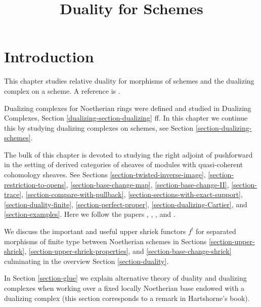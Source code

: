 

%


\title{Duality for Schemes}


\maketitle

\label{section-phantom}

\tableofcontents

\section{Introduction}
\label{section-introduction}

\noindent
This chapter studies relative duality for morphisms of schemes
and the dualizing complex on a scheme. A reference is \cite{RD}.

\medskip\noindent
Dualizing complexes for Noetherian rings were defined and studied in
Dualizing Complexes, Section \ref{dualizing-section-dualizing} ff.
In this chapter we continue this by studying dualizing complexes on
schemes, see Section \ref{section-dualizing-schemes}.

\medskip\noindent
The bulk of this chapter is devoted to studying the right adjoint
of pushforward in the setting of derived categories of sheaves
of modules with quasi-coherent cohomology sheaves.
See Sections
\ref{section-twisted-inverse-image},
\ref{section-restriction-to-opens},
\ref{section-base-change-map},
\ref{section-base-change-II},
\ref{section-trace},
\ref{section-compare-with-pullback},
\ref{section-sections-with-exact-support},
\ref{section-duality-finite},
\ref{section-perfect-proper},
\ref{section-dualizing-Cartier}, and
\ref{section-examples}.
Here we follow the papers 
\cite{Neeman-Grothendieck}, \cite{LN},
\cite{Lipman-notes}, and \cite{Neeman-improvement}.

\medskip\noindent
We discuss the important and useful upper shriek functors $f^!$ for
separated morphisms of finite type between Noetherian schemes in
Sections \ref{section-upper-shriek},
\ref{section-upper-shriek-properties}, and
\ref{section-base-change-shriek}
culminating in the overview Section
\ref{section-duality}.

\medskip\noindent
In Section \ref{section-glue}
we explain alternative theory of duality and dualizing
complexes when working over a fixed locally Noetherian
base endowed with a dualizing complex (this section corresponds
to a remark in Hartshorne's book).

